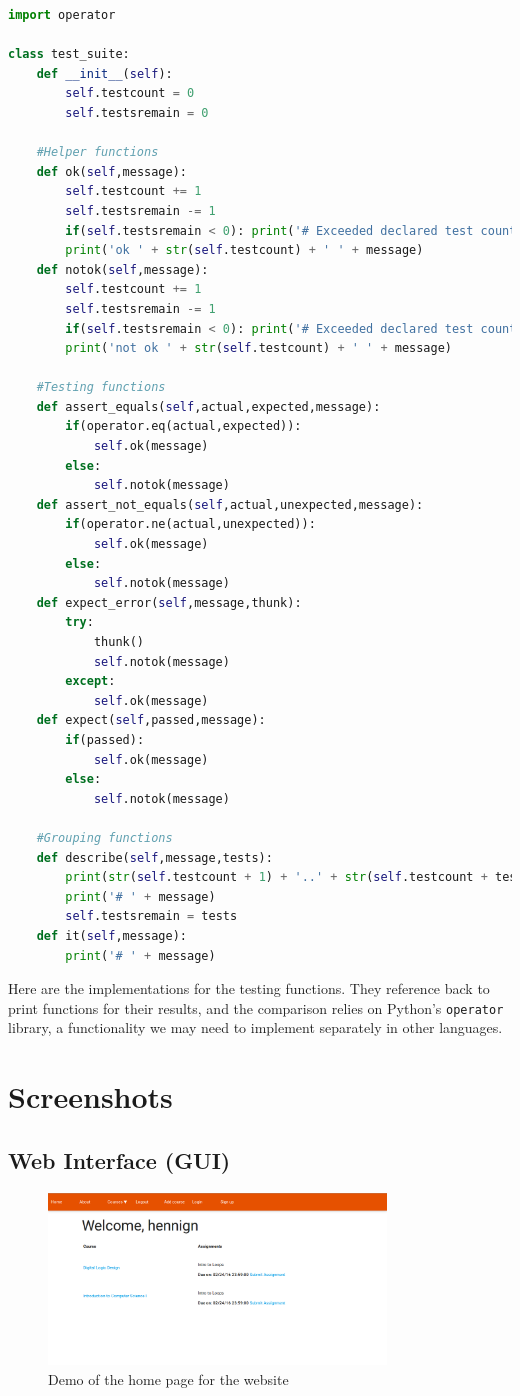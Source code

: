 \documentclass[10pt,draftclsnofoot,onecolumn]{IEEEtran}
\begin{document}
\begin{lstlisting}[language=Python]
import operator

class test_suite:
	def __init__(self):
		self.testcount = 0
		self.testsremain = 0

	#Helper functions
	def ok(self,message):
		self.testcount += 1
		self.testsremain -= 1
		if(self.testsremain < 0): print('# Exceeded declared test count for this "describe"!')
		print('ok ' + str(self.testcount) + ' ' + message)
	def notok(self,message):
		self.testcount += 1
		self.testsremain -= 1
		if(self.testsremain < 0): print('# Exceeded declared test count for this "describe"!')
		print('not ok ' + str(self.testcount) + ' ' + message)

	#Testing functions
	def assert_equals(self,actual,expected,message):
		if(operator.eq(actual,expected)):
			self.ok(message)
		else:
			self.notok(message)
	def assert_not_equals(self,actual,unexpected,message):
		if(operator.ne(actual,unexpected)):
			self.ok(message)
		else:
			self.notok(message)
	def expect_error(self,message,thunk):
		try:
			thunk()
			self.notok(message)
		except:
			self.ok(message)
	def expect(self,passed,message):
		if(passed):
			self.ok(message)
		else:
			self.notok(message)

	#Grouping functions
	def describe(self,message,tests):
		print(str(self.testcount + 1) + '..' + str(self.testcount + tests))
		print('# ' + message)
		self.testsremain = tests
	def it(self,message):
		print('# ' + message)
\end{lstlisting}
Here are the implementations for the testing functions. They reference back to
print functions for their results, and the comparison relies on Python’s
\texttt{operator} library, a functionality we may need to implement separately
in other languages.

\section{Screenshots}
\subsection{Web Interface (GUI)}
\begin{figure}[H]
	\centering
	\includegraphics[width=0.8\textwidth]{index-page}
	\caption{Demo of the home page for the website}
\end{figure}
\end{document}
